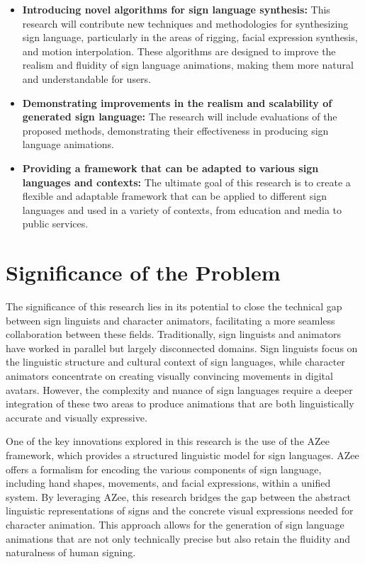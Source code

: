 \documentclass[../../main.tex]{subfiles}
\begin{document}
\begin{itemize}
    \item \textbf{Introducing novel algorithms for sign language synthesis:} This research will contribute new techniques and methodologies for synthesizing sign language, particularly in the areas of rigging, facial expression synthesis, and motion interpolation. These algorithms are designed to improve the realism and fluidity of sign language animations, making them more natural and understandable for users.
    \item \textbf{Demonstrating improvements in the realism and scalability of generated sign language:} The research will include evaluations of the proposed methods, demonstrating their effectiveness in producing sign language animations.
    \item \textbf{Providing a framework that can be adapted to various sign languages and contexts:} The ultimate goal of this research is to create a flexible and adaptable framework that can be applied to different sign languages and used in a variety of contexts, from education and media to public services.
\end{itemize}

\section{Significance of the Problem}

The significance of this research lies in its potential to close the technical gap between sign linguists and character animators, facilitating a more seamless collaboration between these fields. Traditionally, sign linguists and animators have worked in parallel but largely disconnected domains. Sign linguists focus on the linguistic structure and cultural context of sign languages, while character animators concentrate on creating visually convincing movements in digital avatars. However, the complexity and nuance of sign languages require a deeper integration of these two areas to produce animations that are both linguistically accurate and visually expressive.

One of the key innovations explored in this research is the use of the AZee framework, which provides a structured linguistic model for sign languages. AZee offers a formalism for encoding the various components of sign language, including hand shapes, movements, and facial expressions, within a unified system. By leveraging AZee, this research bridges the gap between the abstract linguistic representations of signs and the concrete visual expressions needed for character animation. This approach allows for the generation of sign language animations that are not only technically precise but also retain the fluidity and naturalness of human signing.
\end{document}
